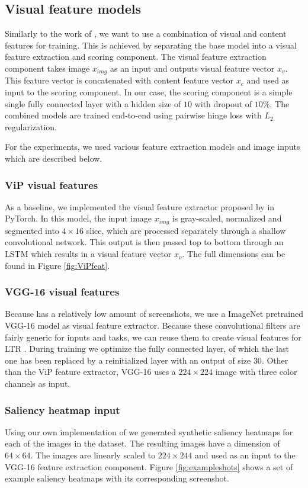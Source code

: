 \subsection{Visual feature models}
Similarly to the work of \citet{fan2017learning}, we want to use a combination of visual and content features for training. This is achieved by separating the base model into a visual feature extraction and scoring component. The visual feature extraction component takes image $x_{img}$ as an input and outputs visual feature vector $x_{v}$. This feature vector is concatenated with content feature vector $x_{c}$ and used as input to the scoring component. In our case, the scoring component is a simple single fully connected layer with a hidden size of $10$ with dropout of $10\%$. The combined models are trained end-to-end using pairwise hinge loss with $L_2$ regularization. 

For the experiments, we used various feature extraction models and image inputs which are described below.


\subsubsection{ViP visual features}
As a baseline, we implemented the visual feature extractor proposed by \citet{fan2017learning} in PyTorch. In this model, the input image $x_{img}$ is gray-scaled, normalized and segmented into $4\times16$ slice, which are processed separately through a shallow convolutional network. This output is then passed top to bottom through an LSTM which results in a visual feature vector $x_{v}$. The full dimensions can be found in Figure \ref{fig:ViPfeat}.

\subsubsection{VGG-16 visual features}
Because \datasetname has a relatively low amount of screenshots, we use a ImageNet pretrained VGG-16 \cite{simonyan2014very} model as visual feature extractor. Because these convolutional filters are fairly generic for inputs and tasks, we can reuse them to create visual features for LTR . During training we optimize the fully connected layer, of which the last one has been replaced by a reinitialized layer with an output of size $30$.  Other than the ViP feature extractor, VGG-16 uses a $224\times224$ image with three color channels as input. 

\subsubsection{Saliency heatmap input}
Using our own implementation of \citet{shan2017two} we generated synthetic saliency heatmaps for each of the images in the \datasetname dataset. The resulting images have a dimension of $64\times64$. The images are linearly scaled to $224\times244$ and used as an input to the VGG-16 feature extraction component. Figure \ref{fig:exampleshots} shows a set of example saliency heatmaps with its corresponding screenshot. 

